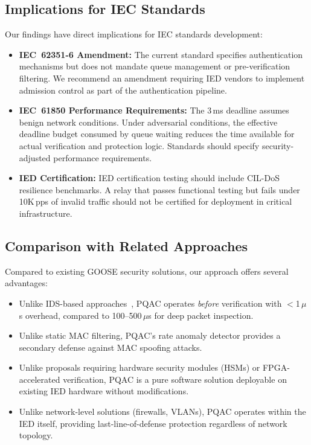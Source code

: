 \documentclass[journal]{IEEEtran}
\begin{document}
\subsection{Implications for IEC Standards}
Our findings have direct implications for IEC standards development:
\begin{itemize}[leftmargin=*]
    \item \textbf{IEC~62351-6 Amendment:} The current standard specifies authentication mechanisms but does not mandate queue management or pre-verification filtering. We recommend an amendment requiring IED vendors to implement admission control as part of the authentication pipeline.
    \item \textbf{IEC~61850 Performance Requirements:} The 3\,ms deadline assumes benign network conditions. Under adversarial conditions, the effective deadline budget consumed by queue waiting reduces the time available for actual verification and protection logic. Standards should specify security-adjusted performance requirements.
    \item \textbf{IED Certification:} IED certification testing should include CIL-DoS resilience benchmarks. A relay that passes functional testing but fails under 10K\,pps of invalid traffic should not be certified for deployment in critical infrastructure.
\end{itemize}

\subsection{Comparison with Related Approaches}
Compared to existing GOOSE security solutions, our approach offers several advantages:
\begin{itemize}[leftmargin=*]
    \item Unlike IDS-based approaches~\cite{hussain2019goose}, PQAC operates \emph{before} verification with $<$1\,$\mu$s overhead, compared to 100--500\,$\mu$s for deep packet inspection.
    \item Unlike static MAC filtering, PQAC's rate anomaly detector provides a secondary defense against MAC spoofing attacks.
    \item Unlike proposals requiring hardware security modules (HSMs) or FPGA-accelerated verification, PQAC is a pure software solution deployable on existing IED hardware without modifications.
    \item Unlike network-level solutions (firewalls, VLANs), PQAC operates within the IED itself, providing last-line-of-defense protection regardless of network topology.
\end{itemize}
\end{document}
